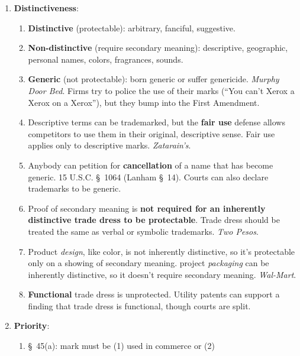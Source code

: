 \begin{enumerate}
    \begin{enumerate}
        \item \textbf{Distinctiveness}:
        \begin{enumerate}
            \item \textbf{Distinctive} (protectable): arbitrary, fanciful, 
            suggestive.
            \item \textbf{Non-distinctive} (require secondary meaning): 
            descriptive, geographic, personal names, colors, fragrances, 
            sounds.
            \item \textbf{Generic} (not protectable): born generic or suffer 
            genericide. \emph{Murphy Door Bed}. Firms try to police the use of 
            their marks (``You can't Xerox a Xerox on a Xerox''), but they 
            bump into the First Amendment.
            \item Descriptive terms can be trademarked, but the \textbf{fair 
            use} defense allows competitors to use them in their original, 
            descriptive sense. Fair use applies only to descriptive marks. 
            \emph{Zatarain's}.
            \item Anybody can petition for \textbf{cancellation} of a name 
            that has become generic. 15 U.S.C. \S\ 1064 (Lanham \S\ 14). 
            Courts can also declare trademarks to be generic.
            \item Proof of secondary meaning is \textbf{not required for an 
            inherently distinctive trade dress to be protectable}. Trade dress 
            should be treated the same as verbal or symbolic trademarks. 
            \emph{Two Pesos}.
            \item Product \emph{design}, like color, is not inherently 
            distinctive, so it's protectable only on a showing of secondary 
            meaning. project \emph{packaging} can be inherently distinctive, 
            so it doesn't require secondary meaning. \emph{Wal-Mart}.
            \item \textbf{Functional} trade dress is unprotected. Utility 
            patents can support a finding that trade dress is functional, 
            though courts are split.
        \end{enumerate}
        \item \textbf{Priority}:
        \begin{enumerate}
            \item \S\ 45(a): mark must be (1) used in commerce or (2) 

\end{enumerate}
\end{enumerate}
\end{enumerate}
